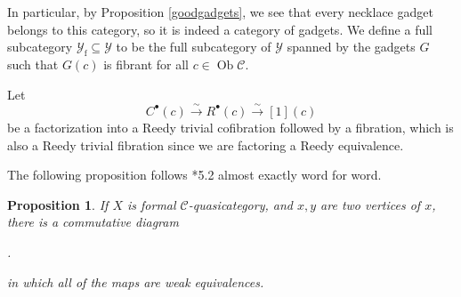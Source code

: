 \documentclass{amsart}
\numberwithin{equation}{section}
\theoremstyle{plain}   %
\newtheorem{prop}[subsection]{Proposition}
\theoremstyle{remark}
\theoremstyle{plain}
\DeclareMathOperator{\Ob}{Ob}
\newcommand{\Nec}{\ensuremath{{\mathcal{N}ec}}}
\newcommand{\overcat}[2]{{\left(#1\downarrow #2\right)}}
\newcommand{\C}{\ensuremath{\mathcal{C}}}
\newcommand{\cellset}{\ensuremath{\widehat{\Theta[\mathcal{C}]}}}
\begin{document}
In particular, by Proposition \ref{goodgadgets}, we see that every necklace gadget belongs to this category, so it is indeed a category of gadgets.  We define a full subcategory \(\mathcal{Y}_{\mathrm{f}}\subseteq \mathcal{Y}\) to be the full subcategory of \(\mathcal{Y}\) spanned by the gadgets \(G\) such that \(G(c)\) is fibrant for all \(c\in \Ob \C\).

Let
\[C^\bullet(c) \xrightarrow{\sim} R^\bullet(c)\xrightarrow{\sim} [1](c)\]
be a factorization into a Reedy trivial cofibration followed by a fibration, which is also a Reedy trivial fibration since we are factoring a Reedy equivalence.

The following proposition follows \cite{ds2}*{5.2} almost exactly word for word.

\begin{prop} 
  If \(X\) is formal \(\C\)-quasicategory,  and \(x,y\) are two vertices of \(x\), there is a commutative diagram
	\begin{center}
		.
	\end{center}
	in which all of the maps are weak equivalences.
\end{prop}
\end{document}
